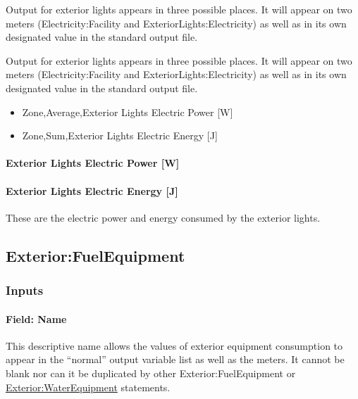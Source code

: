 Output for exterior lights appears in three possible places. It will appear on two meters (Electricity:Facility and ExteriorLights:Electricity) as well as in its own designated value in the standard output file.

Output for exterior lights appears in three possible places. It will appear on two meters (Electricity:Facility and ExteriorLights:Electricity) as well as in its own designated value in the standard output file.

\begin{itemize}
\item
  Zone,Average,Exterior Lights Electric Power {[}W{]}
\item
  Zone,Sum,Exterior Lights Electric Energy {[}J{]}
\end{itemize}

\paragraph{Exterior Lights Electric Power {[}W{]}}\label{exterior-lights-electric-power-w}

\paragraph{Exterior Lights Electric Energy {[}J{]}}\label{exterior-lights-electric-energy-j}

These are the electric power and energy consumed by the exterior lights.

\subsection{Exterior:FuelEquipment}\label{exteriorfuelequipment}

\subsubsection{Inputs}\label{inputs-1-015}

\paragraph{Field: Name}\label{field-name-1-014}

This descriptive name allows the values of exterior equipment consumption to appear in the ``normal'' output variable list as well as the meters. It cannot be blank nor can it be duplicated by other Exterior:FuelEquipment or \hyperref[exteriorwaterequipment]{Exterior:WaterEquipment} statements.

